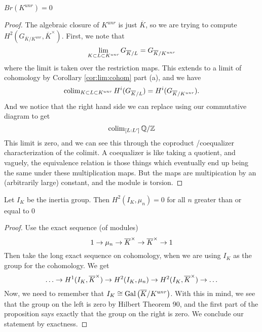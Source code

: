 \begin{corollary} \coproof
	\(Br(K^{unr}) = 0\)
\end{corollary}

\begin{proof}
		\item The algebraic closure of \(K^{unr}\) is just \(\overline{K}\),
			so we are trying to compute 
			\(H^{2}(G_{\overline{K} / K^{unr}},\overline{K}^{\times})\).
			First, we note that
			 \[
			 \lim_{K \subset L \subset K^{unr}} G_{\overline{K} / L} 
			 = G_{\overline{K} / K^{unr}}
			 \] 
			where the limit is taken over the restriction maps.
			This extends to a limit of cohomology by 
			Corollary \ref{cor:lim:cohom} part (a), and
			we have
			\[
				\operatorname{colim}_{K \subset L \subset K^{unr}} H^{i}(G_{\overline{K} / L}) 
				= H^{i}(G_{\overline{K} / K^{unr}})
			.\] 
			And we notice that the right hand side we can replace using
			our commutative diagram to get
			\[
				\operatorname{colim}_{[L:L^{\prime}]} \mathbb{Q} / \mathbb{Z}
			\] 
			This limit is zero, and we can see this through the coproduct
			/coequalizer characterization of the colimit. 
			A coequalizer is like taking a quotient, and vaguely, the 
			equivalence relation is those things which eventually end up being
			the same under these multiplication maps. 
			But the maps are multipication by an (arbitrarily large) constant,
			and the module is torsion.
	
\end{proof}

\begin{corollary} \coproof
Let $I_K$ be the inertia group. Then
	\(H^{2}(I_{K},\mu_{n}) = 0\) for all \(n\) greater than 
	or equal to \(0\)
\end{corollary}

\begin{proof} 
		\item Use the exact sequence (of modules) 
			\[
			1 \to \mu_{n} \to \overline{K}^{\times} \to \overline{K}^{\times}
			\to 1
			\] 
			Then take the long exact sequence on cohomology, when we are using
			\(I_{K}\) as the group for the cohomology.
			We get 
			\[
				\ldots \to H^{1}(I_{K},\overline{K}^{\times}) \to
				H^{2}(I_{K}, \mu_{n}) \to H^{2}(I_{K},\overline{K}^{\times})
				\to \ldots
			\] 
			Now, we need to remember that 
            \(I_{K} \cong \operatorname{Gal}\left( \overline{K} / K^{unr} \right)\).
			With this in mind, we see that
			the group on the left is zero by Hilbert Theorem 90,
			and
			the first part of the proposition
			says exactly that the group on the right is zero. 
			We conclude our statement by exactness.
\end{proof}


